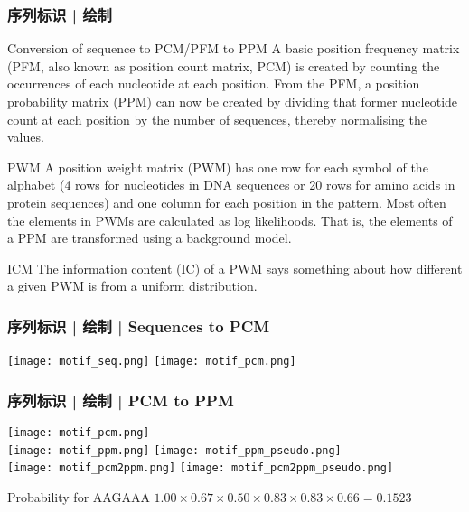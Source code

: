 \begin{frame}
  \frametitle{序列标识 | 绘制}
  \begin{block}{Conversion of sequence to PCM/PFM to PPM}
    {\small A basic position frequency matrix (PFM, also known as position count matrix, PCM) is created by counting the occurrences of each nucleotide at each position. From the PFM, a position probability matrix (PPM) can now be created by dividing that former nucleotide count at each position by the number of sequences, thereby normalising the values.}
  \end{block}
  \vspace{-0.5em}
  \begin{block}{PWM}
    {\small A position weight matrix (PWM) has one row for each symbol of the alphabet (4 rows for nucleotides in DNA sequences or 20 rows for amino acids in protein sequences) and one column for each position in the pattern. Most often the elements in PWMs are calculated as log likelihoods. That is, the elements of a PPM are transformed using a background model.}
  \end{block}
  \vspace{-0.5em}
  \begin{block}{ICM}
    {\small The information content (IC) of a PWM says something about how different a given PWM is from a uniform distribution.}
  \end{block}
\end{frame}

\begin{frame}
  \frametitle{序列标识 | 绘制 | Sequences to PCM}
  \begin{center}
    \texttt{[image: motif\_seq.png]}
    \hspace{1em}
    \texttt{[image: motif\_pcm.png]}
  \end{center}
\end{frame}

\begin{frame}
  \frametitle{序列标识 | 绘制 | PCM to PPM}
  \begin{center}
    \texttt{[image: motif\_pcm.png]}\\
    \vspace{1em}
    \texttt{[image: motif\_ppm.png]}
    \hspace{1em}
    \texttt{[image: motif\_ppm\_pseudo.png]}\\
    \texttt{[image: motif\_pcm2ppm.png]}
    \hspace{8em}
    \texttt{[image: motif\_pcm2ppm\_pseudo.png]}
  \end{center}
  \vspace{-1em}
  \begin{block}{Probability for AAGAAA}
    $1.00\times 0.67\times 0.50\times 0.83\times 0.83\times 0.66 = 0.1523$
  \end{block}
\end{frame}


